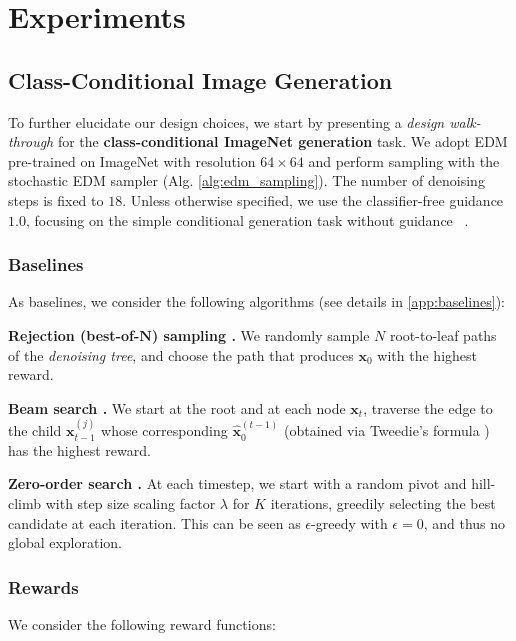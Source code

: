 \documentclass{article}
\newcommand{\x}{\mathbf{x}}
\begin{document}
\section{Experiments}
\label{experiments}

\subsection{Class-Conditional Image Generation}

%
To further elucidate our design choices, we start by presenting a \textit{design walk-through} for the \textbf{class-conditional ImageNet generation} task. We adopt EDM \citep{karras2022elucidatingdesignspacediffusionbased} pre-trained on ImageNet with resolution
$64\times 64$ and perform sampling with the stochastic EDM sampler (Alg. \autoref{alg:edm_sampling}). The number of denoising steps is fixed to $18$. Unless otherwise specified, we use the classifier-free guidance $1.0$, focusing on the simple conditional generation task without guidance~\citep{ho2022classifierfreediffusionguidance} .

\subsubsection{Baselines}

As baselines, we consider the following algorithms (see details in \autoref{app:baselines}):

\textbf{Rejection (best-of-$\bm{N}$) sampling \citep{chatterjee2017samplesizerequiredimportance}.} We randomly sample $N$ root-to-leaf paths of the \textit{denoising tree}, and choose the path that produces $\x_0$ with the highest reward.

\textbf{Beam search \citep{fernandes2025latentbeamdiffusionmodels}.} We start at the root and at each node $\x_t$, traverse the edge to the child $\x_{t-1}^{(j)}$ whose corresponding $\hat{\x}_0^{(t-1)}$ (obtained via Tweedie's formula \citep{tweedie}) has the highest reward.

\textbf{Zero-order search \citep{ma2025inferencetimescalingdiffusionmodels}.} At each timestep, we start with a random pivot and hill-climb with step size scaling factor $\lambda$ for $K$ iterations, greedily selecting the best candidate at each iteration. This can be seen as $\epsilon$-greedy with $\epsilon=0$, and thus no global exploration.


\subsubsection{Rewards}
%
We consider the following reward functions:
\end{document}
